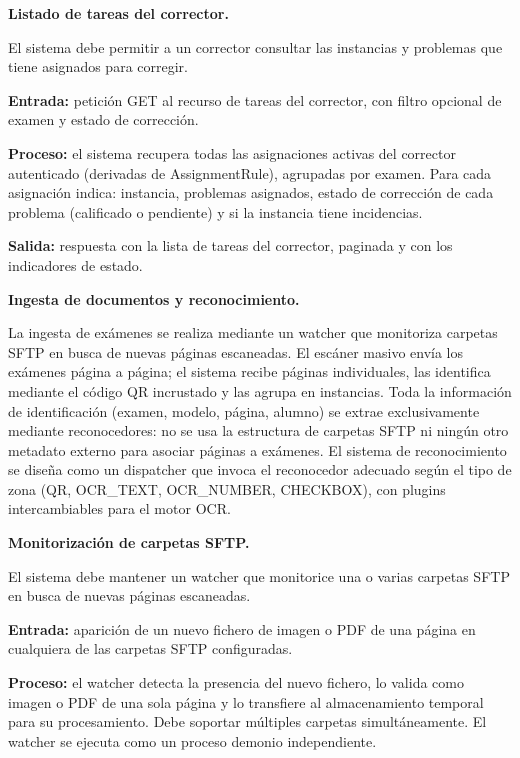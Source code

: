 \begin{functional}
\begin{functional}
    \item \textbf{Listado de tareas del corrector.}

    El sistema debe permitir a un corrector consultar las instancias y problemas que tiene asignados para corregir.

    \textbf{Entrada:} petición GET al recurso de tareas del corrector, con filtro opcional de examen y estado de corrección.

    \textbf{Proceso:} el sistema recupera todas las asignaciones activas del corrector autenticado (derivadas de AssignmentRule), agrupadas por examen. Para cada asignación indica: instancia, problemas asignados, estado de corrección de cada problema (calificado o pendiente) y si la instancia tiene incidencias.

    \textbf{Salida:} respuesta con la lista de tareas del corrector, paginada y con los indicadores de estado.

  \end{functional}

  \item \textbf{Ingesta de documentos y reconocimiento.}

  La ingesta de exámenes se realiza mediante un watcher que monitoriza carpetas SFTP en busca de nuevas páginas escaneadas. El escáner masivo envía los exámenes página a página; el sistema recibe páginas individuales, las identifica mediante el código QR incrustado y las agrupa en instancias. Toda la información de identificación (examen, modelo, página, alumno) se extrae exclusivamente mediante reconocedores: no se usa la estructura de carpetas SFTP ni ningún otro metadato externo para asociar páginas a exámenes. El sistema de reconocimiento se diseña como un dispatcher que invoca el reconocedor adecuado según el tipo de zona (QR, OCR\_TEXT, OCR\_NUMBER, CHECKBOX), con plugins intercambiables para el motor OCR.

  \begin{functional}
    \item \textbf{Monitorización de carpetas SFTP.}

    El sistema debe mantener un watcher que monitorice una o varias carpetas SFTP en busca de nuevas páginas escaneadas.

    \textbf{Entrada:} aparición de un nuevo fichero de imagen o PDF de una página en cualquiera de las carpetas SFTP configuradas.

    \textbf{Proceso:} el watcher detecta la presencia del nuevo fichero, lo valida como imagen o PDF de una sola página y lo transfiere al almacenamiento temporal para su procesamiento. Debe soportar múltiples carpetas simultáneamente. El watcher se ejecuta como un proceso demonio independiente.


\end{functional}
\end{functional}
